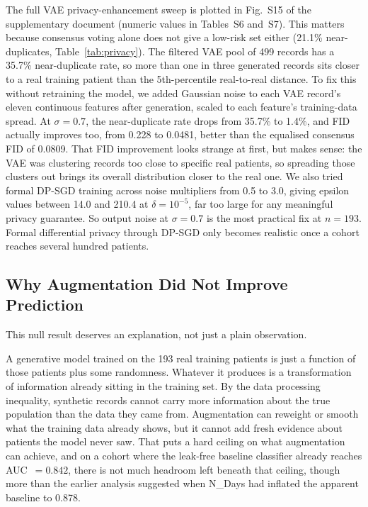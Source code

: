\documentclass[journal]{IEEEtran}
\begin{document}
The full VAE privacy-enhancement sweep is plotted in Fig.~S15 of the supplementary document (numeric values in Tables~S6 and~S7). This matters because consensus voting alone does not give a low-risk set either (21.1\% near-duplicates, Table~\ref{tab:privacy}). The filtered VAE pool of 499 records has a 35.7\% near-duplicate rate, so more than one in three generated records sits closer to a real training patient than the 5th-percentile real-to-real distance. To fix this without retraining the model, we added Gaussian noise to each VAE record's eleven continuous features after generation, scaled to each feature's training-data spread. At $\sigma=0.7$, the near-duplicate rate drops from 35.7\% to 1.4\%, and FID actually improves too, from 0.228 to 0.0481, better than the equalised consensus FID of 0.0809. That FID improvement looks strange at first, but makes sense: the VAE was clustering records too close to specific real patients, so spreading those clusters out brings its overall distribution closer to the real one. We also tried formal DP-SGD training across noise multipliers from 0.5 to 3.0, giving epsilon values between 14.0 and 210.4 at $\delta=10^{-5}$, far too large for any meaningful privacy guarantee. So output noise at $\sigma=0.7$ is the most practical fix at $n=193$. Formal differential privacy through DP-SGD only becomes realistic once a cohort reaches several hundred patients.

\subsection{Why Augmentation Did Not Improve Prediction}
\label{sec:whynot}

This null result deserves an explanation, not just a plain observation.

A generative model trained on the 193 real training patients is just a function of those patients plus some randomness. Whatever it produces is a transformation of information already sitting in the training set. By the data processing inequality, synthetic records cannot carry more information about the true population than the data they came from. Augmentation can reweight or smooth what the training data already shows, but it cannot add fresh evidence about patients the model never saw. That puts a hard ceiling on what augmentation can achieve, and on a cohort where the leak-free baseline classifier already reaches AUC~$=0.842$, there is not much headroom left beneath that ceiling, though more than the earlier analysis suggested when N\_Days had inflated the apparent baseline to 0.878.
\end{document}
